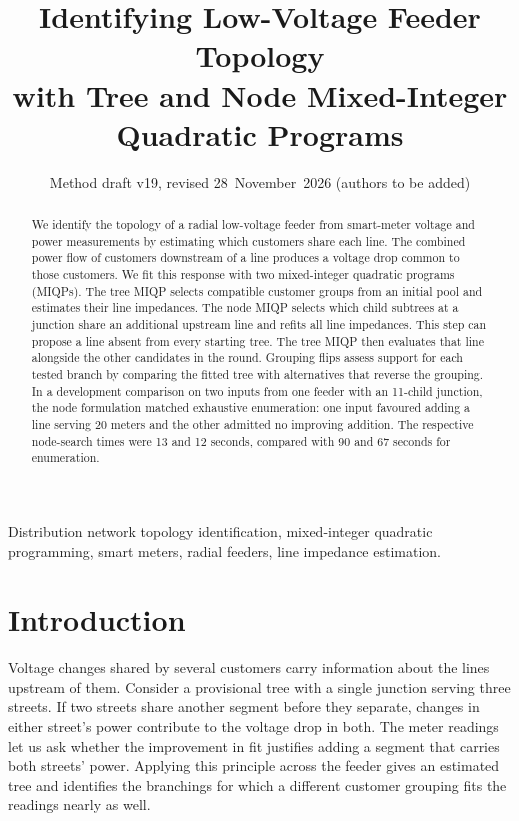 \documentclass[journal,onecolumn,11pt]{IEEEtran}
\begin{document}
\title{Identifying Low-Voltage Feeder Topology\\ with Tree and Node Mixed-Integer Quadratic Programs}
\author{Method draft v19, revised 28~November~2026 (authors to be added)}
\maketitle

\begin{abstract}
We identify the topology of a radial low-voltage feeder from smart-meter voltage and power measurements by
estimating which customers share each line. The combined power flow of customers downstream of a line produces
a voltage drop common to those customers. We fit this response with two mixed-integer quadratic programs (MIQPs).
The tree MIQP selects compatible customer groups from an initial pool and estimates their line impedances.
The node MIQP selects which child subtrees at a junction share an additional upstream line and refits all line
impedances. This step can propose a line absent from every starting tree. The tree MIQP then evaluates that
line alongside the other candidates in the round. Grouping flips assess support for each tested branch by
comparing the fitted tree with alternatives that reverse the grouping.
In a development comparison on two inputs from one feeder with an
11-child junction, the node formulation matched exhaustive enumeration: one input favoured adding a line serving 20
meters and the other admitted no improving addition. The respective node-search times were 13 and 12 seconds,
compared with 90 and 67 seconds for enumeration.
\end{abstract}

\begin{IEEEkeywords}
Distribution network topology identification, mixed-integer quadratic programming, smart meters, radial feeders,
line impedance estimation.
\end{IEEEkeywords}

\section{Introduction}
Voltage changes shared by several customers carry information about the lines upstream of them. Consider a provisional
tree with a single junction serving three streets. If two streets share another segment before they separate, changes
in either street's power contribute to the voltage drop in both. The meter readings let us ask whether the
improvement in fit justifies adding a segment that carries both streets' power. Applying this principle across
the feeder gives an estimated tree and identifies the branchings
for which a different customer grouping fits the readings nearly as well.
\end{document}
